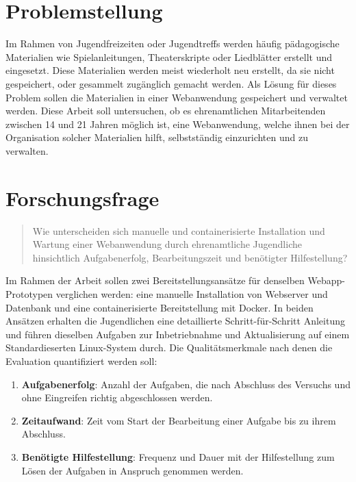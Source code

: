 \documentclass[
    12pt,
    ngerman,
    a4paper,
    oneside
]{book}
\begin{document}


\section*{Problemstellung}
Im Rahmen von Jugendfreizeiten oder Jugendtreffs werden häufig pädagogische Materialien wie Spielanleitungen, Theaterskripte oder Liedblätter erstellt und eingesetzt.
Diese Materialien werden meist wiederholt neu erstellt, da sie nicht gespeichert, oder gesammelt zugänglich gemacht werden.
Als Lösung für dieses Problem sollen die Materialien in einer Webanwendung gespeichert und verwaltet werden.
Diese Arbeit soll untersuchen, ob es ehrenamtlichen Mitarbeitenden zwischen 14 und 21 Jahren möglich ist, eine Webanwendung, welche ihnen bei der Organisation solcher Materialien hilft, selbstständig einzurichten und zu verwalten. 


\section*{Forschungsfrage}

\begin{quote}
Wie unterscheiden sich manuelle und containerisierte Installation und Wartung einer Webanwendung durch ehrenamtliche Jugendliche hinsichtlich Aufgabenerfolg, Bearbeitungszeit und benötigter Hilfestellung?
\end{quote}

\noindent Im Rahmen der Arbeit sollen zwei Bereitstellungsansätze für denselben Webapp-Prototypen verglichen werden: eine manuelle Installation von Webserver und Datenbank und eine containerisierte Bereitstellung mit Docker.
In beiden Ansätzen erhalten die Jugendlichen eine detaillierte Schritt-für-Schritt Anleitung und führen dieselben Aufgaben zur Inbetriebnahme und Aktualisierung auf einem Standardieserten Linux-System durch.
Die Qualitätsmerkmale nach denen die Evaluation quantifiziert werden soll:
\begin{enumerate}[
    label={-},
    leftmargin=*,
    itemsep=0.4em,
    topsep=0.4em
]
    \item \textbf{Aufgabenerfolg}: Anzahl der Aufgaben, die nach Abschluss des Versuchs und ohne Eingreifen richtig abgeschlossen werden.
    \item \textbf{Zeitaufwand}: Zeit vom Start der Bearbeitung einer Aufgabe bis zu ihrem Abschluss.
    \item \textbf{Benötigte Hilfestellung}: Frequenz und Dauer mit der Hilfestellung zum Lösen der Aufgaben in Anspruch genommen werden.
\end{enumerate}
\end{document}
